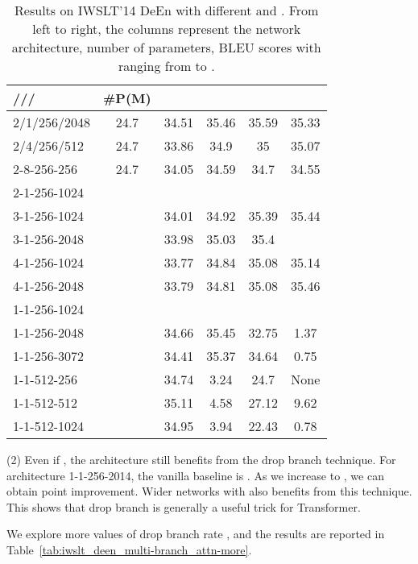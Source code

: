 \documentclass{article}
\begin{document}
\begin{table}[!htbp]
\centering
\small
\caption{Results on IWSLT'14 DeEn with different  and . From left to right, the columns represent the network architecture, number of parameters, BLEU scores with  ranging from  to .}
\begin{tabular}{lccccc}
\toprule
/// &  \#P(M) &   &  &  &  \\
\midrule
2/1/256/2048 &	 24.7 & 	34.51&	35.46&	35.59&	35.33\\
2/4/256/512  &	 24.7 & 	33.86&	34.9&	35&	35.07\\
2-8-256-256  &	 24.7 & 	34.05&	34.59&	34.7&	34.55\\
\midrule
2-1-256-1024 & \\
3-1-256-1024 &	  & 	34.01&	34.92&	35.39&	35.44\\
3-1-256-2048 &	  & 	33.98&	35.03&	35.4&	\\
4-1-256-1024 &	  & 	33.77&	34.84&	35.08&	35.14\\
4-1-256-2048 &	  & 	33.79&	34.81&	35.08&	35.46\\
\midrule
1-1-256-1024 &  &	 &	 &	 &	\\
1-1-256-2048 &  &	34.66 &	35.45 & 32.75 &	1.37 \\
1-1-256-3072 &  & 	34.41 &	35.37 &	34.64 &	0.75 \\
1-1-512-256	 &  & 	34.74 &	3.24 &	24.7 &	None \\
1-1-512-512	 &  &	35.11 &	4.58	& 27.12 & 9.62\\
1-1-512-1024 &  & 	34.95&	3.94&	22.43&	0.78\\
\bottomrule
\end{tabular}
\label{tab:iwslt_deen_diffbranch}
\end{table}



\noindent(2) Even if , the architecture still benefits from the drop branch technique. For architecture 1-1-256-2014, the vanilla baseline is . As we increase  to , we can obtain  point improvement. Wider networks with  also benefits from this technique. This shows that drop branch is generally a useful trick for Transformer.

\fi


We explore more values of drop branch rate , and the results are reported in Table~\ref{tab:iwslt_deen_multi-branch_attn-more}. 
\end{document}

